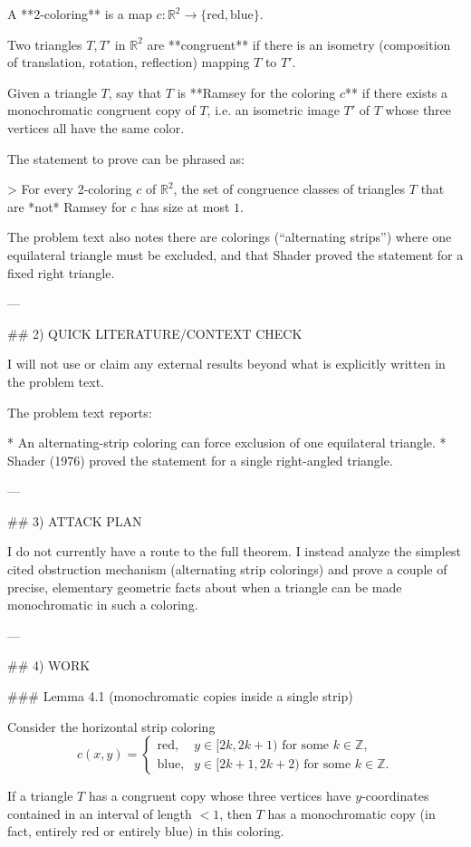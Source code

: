 A **2-coloring** is a map $c:\mathbb R^2\to\{\text{red},\text{blue}\}$.

Two triangles $T,T'$ in $\mathbb R^2$ are **congruent** if there is an isometry (composition of translation, rotation, reflection) mapping $T$ to $T'$.

Given a triangle $T$, say that $T$ is **Ramsey for the coloring $c$** if there exists a monochromatic congruent copy of $T$, i.e. an isometric image $T'$ of $T$ whose three vertices all have the same color.

The statement to prove can be phrased as:

> For every 2-coloring $c$ of $\mathbb R^2$, the set of congruence classes of triangles $T$ that are *not* Ramsey for $c$ has size at most $1$.

The problem text also notes there are colorings (“alternating strips”) where one equilateral triangle must be excluded, and that Shader proved the statement for a fixed right triangle.

---

## 2) QUICK LITERATURE/CONTEXT CHECK

I will not use or claim any external results beyond what is explicitly written in the problem text.

The problem text reports:

* An alternating-strip coloring can force exclusion of one equilateral triangle.
* Shader (1976) proved the statement for a single right-angled triangle.

---

## 3) ATTACK PLAN

I do not currently have a route to the full theorem. I instead analyze the simplest cited obstruction mechanism (alternating strip colorings) and prove a couple of precise, elementary geometric facts about when a triangle can be made monochromatic in such a coloring.

---

## 4) WORK

### Lemma 4.1 (monochromatic copies inside a single strip)

Consider the horizontal strip coloring
\[
c(x,y)=\begin{cases}
\text{red},& y\in [2k,2k+1)\text{ for some }k\in\mathbb Z,\\
\text{blue},& y\in [2k+1,2k+2)\text{ for some }k\in\mathbb Z.
\end{cases}
\]

If a triangle $T$ has a congruent copy whose three vertices have $y$-coordinates contained in an interval of length $<1$, then $T$ has a monochromatic copy (in fact, entirely red or entirely blue) in this coloring.

